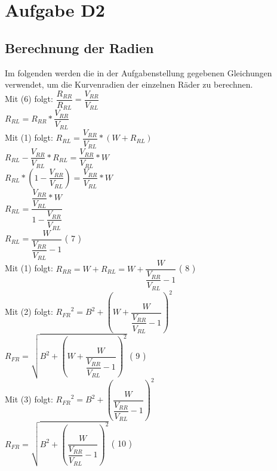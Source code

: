 \chapter{Aufgabe D2}

\section{Berechnung der Radien}
Im folgenden werden die in der Aufgabenstellung gegebenen Gleichungen verwendet, um die Kurvenradien der einzelnen Räder zu berechnen.\\

	Mit (6) folgt: $ \dfrac{R_{RR}}{R_{RL}} = \dfrac{V_{RR}}{V_{RL}}$  \\
	
	\hspace*{2.5cm}${R_{RL} = {R_{RR}} * \dfrac{V_{RR}}{V_{RL}}}$ \\
	
	Mit (1) folgt: ${R_{RL}} = \dfrac{V_{RR}}{V_{RL}} * (W+{R_{RL}})$ \\
	
	\hspace*{2.5cm}${R_{RL}}-\dfrac{V_{RR}}{V_{RL}}*{R_{RL}} = \dfrac{V_{RR}}{V_{RL}} * W $\\
	
	\hspace*{2.5cm}${R_{RL}}*(1-\dfrac{V_{RR}}{V_{RL}})= \dfrac{V_{RR}}{V_{RL}} * W $\\
	
	\hspace*{2.5cm}${R_{RL}}= \dfrac{\dfrac{V_{RR}}{V_{RL}} * W}{1-\dfrac{V_{RR}}{V_{RL}}}$ \\
	
	\hspace*{2.5cm}${R_{RL}}= \dfrac{W}{\dfrac{V_{RR}}{V_{RL}}-1}$    \hfill ( 7 )\\
	Mit (1) folgt: ${R_{RR}}= W + {R_{RL}} = W + \dfrac{W}{\dfrac{V_{RR}}{V_{RL}}-1}$  \hfill ( 8 )\\
	
	Mit (2) folgt: ${R_{FR}}^2= B^2 + (W + \dfrac{W}{\dfrac{V_{RR}}{V_{RL}}-1})^2$ \\
	\hspace*{2.5cm}${R_{FR}} = \sqrt{B^2 + (W + \dfrac{W}{\dfrac{V_{RR}}{V_{RL}}-1})^2}$ \hfill ( 9 )\\
	
	Mit (3) folgt: ${R_{FR}}^2= B^2 + (\dfrac{W}{\dfrac{V_{RR}}{V_{RL}}-1})^2$\\
	\hspace*{2.5cm}${R_{FR}} = \sqrt{B^2 + (\dfrac{W}{\dfrac{V_{RR}}{V_{RL}}-1})^2}$  \hfill ( 10 )\\ 
	
